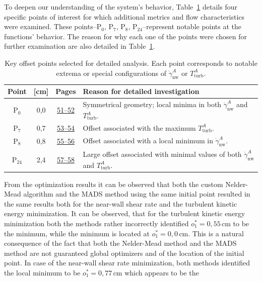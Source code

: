To deepen our understanding of the system’s behavior, Table~\ref{tab:studied points} details four specific points of interest for which additional metrics and flow characteristics were examined. These points--P$_0$, P$_7$, P$_8$, P$_24$--represent notable points at the functions' behavior. The reason for why each one of the points were chosen for further examination are also detailed in Table~\ref{tab:studied points}.
\vspace{7mm}
\begin{table}[H]
	\bgroup
	\centering
	\setlength\tabcolsep{3mm}
	\def\arraystretch{2.2}%
	\begin{tabular}{|c|c|c|p{8cm}|}
		\hline
		\textbf{Point} & \boldmath{$o_1$} \textbf{[cm]} & \textbf{Pages} & \textbf{Reason for detailed investigation} \\ \hline
		P$_0$ & 0{,}0 & \hyperlink{page.51}{51--52} & Symmetrical geometry; local minima in both $\dot{\gamma}^{A}_{\mathrm{nw}}$ and $T^{A}_{\mathrm{turb}}$. \\ \hline
		P$_7$ & 0{,}7 & \hyperlink{page.53}{53--54} & Offset associated with the maximum $T^{A}_{\mathrm{turb}}$. \\ \hline
		P$_8$ & 0{,}8 & \hyperlink{page.55}{55--56} &  Offset associated with a local minimum in $\dot{\gamma}^{A}_{\mathrm{nw}}$. \\ \hline
		P$_{24}$ & 2{,}4 & \hyperlink{page.57}{57--58} & Large offset associated with minimal values of both $\dot{\gamma}^{A}_{\mathrm{nw}}$ and $T^{A}_{\mathrm{turb}}$. \\ \hline
	\end{tabular}
	 \caption{Key offset points selected for detailed analysis. Each point corresponds to notable extrema or special configurations of $\dot{\gamma}^{A}_{\mathrm{nw}}$ or $T^{A}_{\mathrm{turb}}$.}
	\label{tab:studied points}
	\egroup
\end{table}




From the optimization results it can be observed that both the custom Nelder-Mead algorithm and the MADS method using the same initial point resulted in the same results both for the near-wall shear rate and the turbulent kinetic energy minimization. It can be observed, that for the turbulent kinetic energy minimization both the methods rather incorrectly identified $o^{*}_{1} = 0{,}55 \, \mathrm{cm}$ to be the minimum, while the minimum is located at $o^{*}_{1} = 0{,}0 \, \mathrm{cm}$. This is a natural consequence of the fact that both the Nelder-Mead method and the MADS method are not guaranteed global optimizers and of the location of the initial point. In case of the near-wall shear rate minimization, both methods identified the local minimum to be $o^{*}_{1} = 0{,}77 \, \mathrm{cm}$ which appears to be the 
